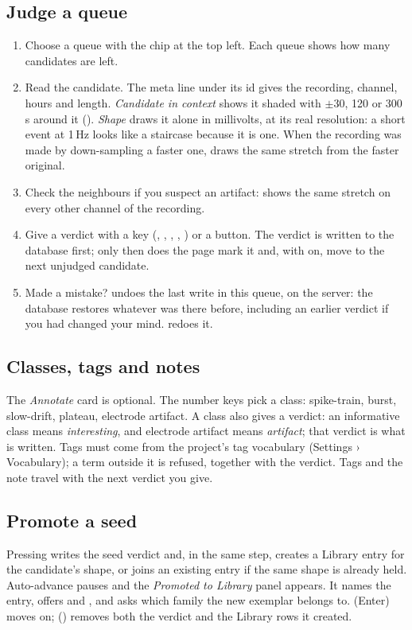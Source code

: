 \subsection{Judge a queue}\label{sec:review-judge}
\begin{enumerate}
  \item Choose a queue with the  chip at the top left. Each queue shows how many
    candidates are left.
  \item Read the candidate. The meta line under its id gives the recording, channel, hours
    and length. \emph{Candidate in context} shows it shaded with $\pm$30, 120 or 300\,s
    around it (). \emph{Shape} draws it alone in millivolts, at its real
    resolution: a short event at 1\,Hz looks like a staircase because it is one. When the
    recording was made by down-sampling a faster one,  draws the same
    stretch from the faster original.
  \item Check the neighbours if you suspect an artifact:  shows the same
    stretch on every other channel of the recording.
  \item Give a verdict with a key (, , , , ) or a button. The
    verdict is written to the database first; only then does the page mark it and, with
     on, move to the next unjudged candidate.
  \item Made a mistake?  undoes the last write in this queue, on the server: the
    database restores whatever was there before, including an earlier verdict if you had
    changed your mind.  redoes it.
\end{enumerate}

\subsection{Classes, tags and notes}\label{sec:review-annotate}
The \emph{Annotate} card is optional. The number keys pick a class:  spike-train,
 burst,  slow-drift,  plateau,  electrode artifact. A class also gives
a verdict: an informative class means \emph{interesting}, and electrode artifact means
\emph{artifact}; that verdict is what is written. Tags must come from the project's tag
vocabulary (Settings › Vocabulary); a term outside it is refused, together with the verdict.
Tags and the note travel with the next verdict you give.

\subsection{Promote a seed}\label{sec:review-promote}
Pressing  writes the seed verdict and, in the same step, creates a Library entry for
the candidate's shape, or joins an existing entry if the same shape is already held.
Auto-advance pauses and the \emph{Promoted to Library} panel appears. It names the entry,
offers  and , and asks which family the new
exemplar belongs to.  (Enter) moves on; 
() removes both the verdict and the Library rows it created.

